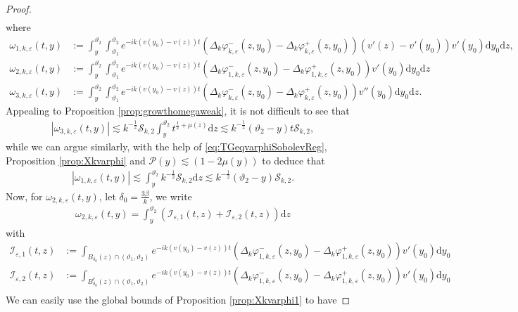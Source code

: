\documentclass[11pt,reqno]{amsproc}
\theoremstyle{definition}
\numberwithin{equation}{section}
\newcommand{\cI}{{\mathcal I}}
\newcommand{\cS}{{\mathcal S}}
\renewcommand{\d}{\mathrm{d}}
\newcommand{\ep}{\varepsilon}
\renewcommand{\P}{{\mathcal{P}}}
\begin{document}
\begin{proof}
\begin{align*}
\end{align*}
where
\begin{align*}
\omega_{1,k,\ep}(t,y) &:=\int_y^{\vartheta_2} \int_{\vartheta_1}^{\vartheta_2}e^{-ik(v(y_0) - v(z)) t} \left( \Delta_k\varphi_{k,\ep}^-(z,y_0) - \Delta_k\varphi_{k,\ep}^+(z,y_0) \right) (v'(z) - v'(y_0))v'(y_0) \d y_0 \d z, \\
\omega_{2,k,\ep}(t,y) &:= \int_{y}^{\vartheta_2} \int_{\vartheta_1}^{\vartheta_2}e^{-ik(v(y_0)-v(z))t}\left( \Delta_k\varphi_{1,k,\ep}^-(z,y_0) - \Delta_k\varphi_{1,k,\ep}^+(z,y_0) \right) v'(y_0) \d y_0 \d z \\
\omega_{3,k,\ep}(t,y) &:= \int_y^{\vartheta_2} \int_{\vartheta_1}^{\vartheta_2}e^{-ik(v(y_0)-v(z))t} \left( \Delta_k\varphi_{k,\ep}^-(z,y_0) - \Delta_k\varphi_{k,\ep}^+(z,y_0) \right) v''(y_0) \d y_0 \d z.
\end{align*}
Appealing to Proposition \ref{prop:growthomegaweak}, it is not difficult to see that 
\begin{align*}
\left| \omega_{3,k,\ep}(t,y) \right| \lesssim k^{-\frac12}\cS_{k,2}\int_y^{\vartheta_2} t^{\frac12+\mu(z)} \d z \lesssim k^{-\frac12}(\vartheta_2-y)t \cS_{k,2},
\end{align*}
while we can argue similarly, with the help of  \eqref{eq:TGeqvarphiSobolevReg}, Proposition \ref{prop:Xkvarphi} and $\P(y)\lesssim (1-2\mu(y))$ to deduce that
\begin{align*}
\left| \omega_{1,k,\ep}(t,y) \right| \lesssim \int_y^{\vartheta_2}k^{-\frac12} \cS_{k,2} \d z \lesssim k^{-\frac12}(\vartheta_2-y)\cS_{k,2}.
\end{align*}
Now, for $\omega_{2,k,\ep}(t,y)$, let $\delta_0=\frac{3\beta}{k}$, we write
\begin{align*}
\omega_{2,k,\ep}(t,y) = \int_y^{\vartheta_2} \left( \cI_{\ep,1}(t,z) + \cI_{\ep,2}(t,z) \right) \d z
\end{align*}
with
\begin{align*}
\cI_{\ep,1}(t,z) &:= \int_{B_{\delta_0}(z)\cap (\vartheta_1,\vartheta_2)} e^{-ik(v(y_0)-v(z))t}\left( \Delta_k\varphi_{1,k,\ep}^-(z,y_0) - \Delta_k\varphi_{1,k,\ep}^+(z,y_0) \right) v'(y_0) \d y_0 \\
\cI_{\ep,2}(t,z) &:= \int_{B_{\delta_0}^c(z)\cap (\vartheta_1,\vartheta_2)} e^{-ik(v(y_0)-v(z))t}\left( \Delta_k\varphi_{1,k,\ep}^-(z,y_0) - \Delta_k\varphi_{1,k,\ep}^+(z,y_0) \right) v'(y_0) \d y_0 \\
\end{align*}
We can easily use the global bounds of Proposition \ref{prop:Xkvarphi1} to have

\end{proof}
\end{document}
